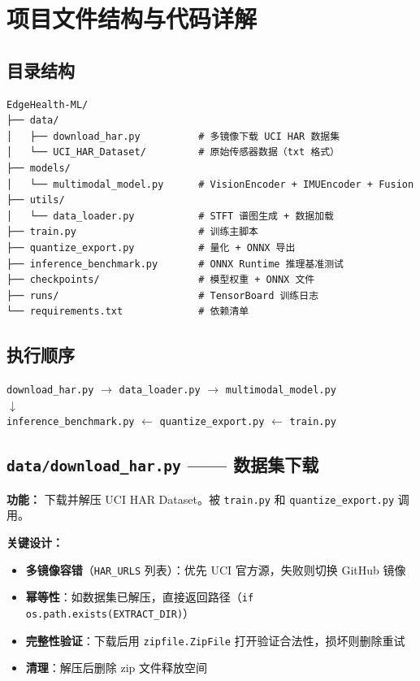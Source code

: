 \documentclass[12pt,a4paper]{ctexart}
\newcommand{\file}[1]{\texttt{#1}}
\newcommand{\code}[1]{\texttt{#1}}
\begin{document}
\section{项目文件结构与代码详解}

\subsection{目录结构}

\begin{verbatim}
EdgeHealth-ML/
├── data/
│   ├── download_har.py          # 多镜像下载 UCI HAR 数据集
│   └── UCI_HAR_Dataset/         # 原始传感器数据（txt 格式）
├── models/
│   └── multimodal_model.py      # VisionEncoder + IMUEncoder + Fusion
├── utils/
│   └── data_loader.py           # STFT 谱图生成 + 数据加载
├── train.py                     # 训练主脚本
├── quantize_export.py           # 量化 + ONNX 导出
├── inference_benchmark.py       # ONNX Runtime 推理基准测试
├── checkpoints/                 # 模型权重 + ONNX 文件
├── runs/                        # TensorBoard 训练日志
└── requirements.txt             # 依赖清单
\end{verbatim}

\subsection{执行顺序}

\begin{center}
\file{download\_har.py} $\rightarrow$ \file{data\_loader.py} $\rightarrow$ \file{multimodal\_model.py} \\
$\downarrow$ \\
\file{inference\_benchmark.py} $\leftarrow$ \file{quantize\_export.py} $\leftarrow$ \file{train.py}
\end{center}

\subsection{\file{data/download\_har.py} —— 数据集下载}

\textbf{功能：} 下载并解压 UCI HAR Dataset。被 \file{train.py} 和 \file{quantize\_export.py} 调用。

\textbf{关键设计：}
\begin{itemize}
    \item \textbf{多镜像容错}（\code{HAR\_URLS} 列表）：优先 UCI 官方源，失败则切换 GitHub 镜像
    \item \textbf{幂等性}：如数据集已解压，直接返回路径（\code{if os.path.exists(EXTRACT\_DIR)}）
    \item \textbf{完整性验证}：下载后用 \code{zipfile.ZipFile} 打开验证合法性，损坏则删除重试
    \item \textbf{清理}：解压后删除 zip 文件释放空间
\end{itemize}
\end{document}
